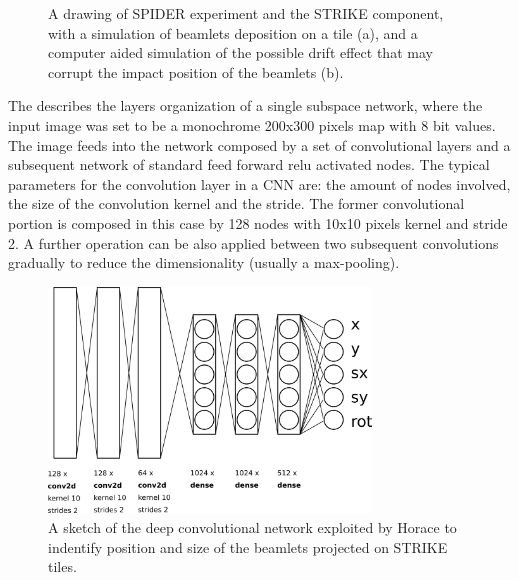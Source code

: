 \begin{figure}
    \centering
    \caption{A drawing of SPIDER experiment and the STRIKE component, with a simulation of beamlets deposition on a tile (a), and a computer aided simulation of the possible drift effect that may corrupt the impact position of the beamlets (b).}
    \label{fig:strike}
\end{figure}
The \Figure{\ref{fig:horace_net}} describes the layers organization of a single subspace network, where the input image was set to be a monochrome 200x300 pixels map with 8 bit values. The image feeds into the network composed by a set of convolutional layers and a subsequent network of standard feed forward relu activated nodes. The typical parameters for the convolution layer in a CNN are: the amount of nodes involved, the size of the convolution kernel and the stride. The former convolutional portion is composed in this case by 128 nodes with 10x10 pixels kernel and stride 2. A further operation can be also applied between two subsequent convolutions gradually to reduce the dimensionality (usually a max-pooling).
\begin{figure}
    \centering
    \includegraphics[height=6cm]{img/APPENDIX/HORACE/image2.png}
    \caption{A sketch of the deep convolutional network exploited by Horace to indentify position and size of the beamlets projected on STRIKE tiles.}
    \label{fig:horace_net}
\end{figure}
